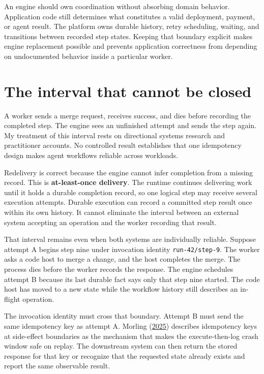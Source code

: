 An engine should own coordination without absorbing domain behavior. Application code still determines what constitutes a valid deployment, payment, or agent result. The platform owns durable history, retry scheduling, waiting, and transitions between recorded step states. Keeping that boundary explicit makes engine replacement possible and prevents application correctness from depending on undocumented behavior inside a particular worker.

\hypertarget{the-interval-that-cannot-be-closed}{%
\section{The interval that cannot be closed}\label{the-interval-that-cannot-be-closed}}

A worker sends a merge request, receives success, and dies before recording the completed step. The engine sees an unfinished attempt and sends the step again. My treatment of this interval rests on directional systems research and practitioner accounts. No controlled result establishes that one idempotency design makes agent workflows reliable across workloads.

Redelivery is correct because the engine cannot infer completion from a missing record. This is \textbf{at-least-once delivery}. The runtime continues delivering work until it holds a durable completion record, so one logical step may receive several execution attempts. Durable execution can record a committed step result once within its own history. It cannot eliminate the interval between an external system accepting an operation and the worker recording that result.

That interval remains even when both systems are individually reliable. Suppose attempt A begins step nine under invocation identity \texttt{run-42/step-9}. The worker asks a code host to merge a change, and the host completes the merge. The process dies before the worker records the response. The engine schedules attempt B because its last durable fact says only that step nine started. The code host has moved to a new state while the workflow history still describes an in-flight operation.

The invocation identity must cross that boundary. Attempt B must send the same idempotency key as attempt A. Morling (\href{https://www.morling.dev/blog/building-durable-execution-engine-with-sqlite/}{2025}) describes idempotency keys at side-effect boundaries as the mechanism that makes the execute-then-log crash window safe on replay. The downstream system can then return the stored response for that key or recognize that the requested state already exists and report the same observable result.

